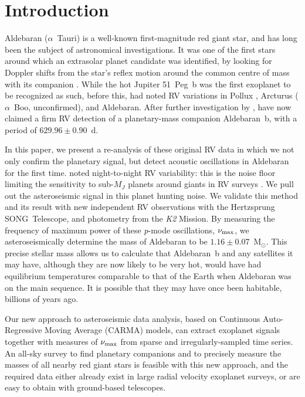 \documentclass[modern]{aastex61}
\newcommand{\numax}{\mbox{$\nu_{\rm max}$}\xspace}
\newcommand{\msun}{\mbox{$\mathrm{M}_{\odot}$}\xspace}
\newcommand{\ktwo}{\emph{K2}\xspace}
\begin{document}
\section{Introduction}

Aldebaran ($\alpha$~Tauri) is a well-known first-magnitude red giant star, and has long been the subject of astronomical investigations. It was one of the first stars around which an extrasolar planet candidate was identified, by looking for Doppler shifts from the star's reflex motion around the common centre of mass with its companion \citep[the radial velocity or RV method;][]{struverv}. While the hot Jupiter 51~Peg~b \citep{51peg} was the first exoplanet to be recognized as such, before this, \citet{hatzes1993} had noted RV variations in Pollux \citep[$\beta$~Gem; subsequently confirmed as a planet:][]{betgemconf,betgemconf2}, Arcturus ($\alpha$~Boo, unconfirmed), and Aldebaran. After further investigation by \citet{Hatzes1998}, \citet{Hatzes2015} have now claimed a firm RV detection of a planetary-mass companion Aldebaran~b, with a period of $629.96 \pm 0.90$~d.

In this paper, we present a re-analysis of these original RV data in which we not only confirm the planetary signal, but detect acoustic oscillations in Aldebaran for the first time. \citet{hatzes1993} noted night-to-night RV variability: this is the noise floor limiting the sensitivity to sub-$M_J$ planets around giants in RV surveys \citep{2005PASJ...57...97S,2014A&A...566A.113J}. We pull out the asteroseismic signal in this planet hunting noise. We validate this method and its result with new independent RV observations with the Hertzsprung SONG~Telescope, and photometry from the \ktwo Mission. By measuring the frequency of maximum power of these \emph{p}-mode oscillations, \numax, we asteroseismically determine the mass of Aldebaran to be $1.16 \pm 0.07$~\msun. This precise stellar mass allows us to calculate that Aldebaran~b and any satellites it may have, although they are now likely to be very hot, would have had equilibrium temperatures comparable to that of the Earth when Aldebaran was on the main sequence. It is possible that they may have once been habitable, billions of years ago.

Our new approach to asteroseismic data analysis, based on Continuous Auto-Regressive Moving Average (CARMA) models, can extract exoplanet signals together with measures of \numax from sparse and irregularly-sampled time series. An all-sky survey to find planetary companions and to precisely measure the masses of all nearby red giant stars is feasible with this new approach, and the required data either already exist in large radial velocity exoplanet surveys, or are easy to obtain with ground-based telescopes.
\end{document}
